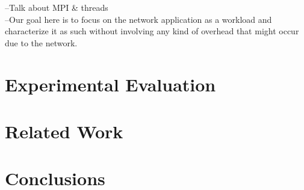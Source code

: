 \documentclass[conference]{IEEEtran}
\begin{document}
--Talk about MPI \& threads\\

--Our goal here is to focus on the network application as a workload and characterize it as such without involving any kind of overhead that might occur due to the network.\\



\section{Experimental Evaluation}

\section{Related Work}

\section{Conclusions}



%
%

\end{document}
